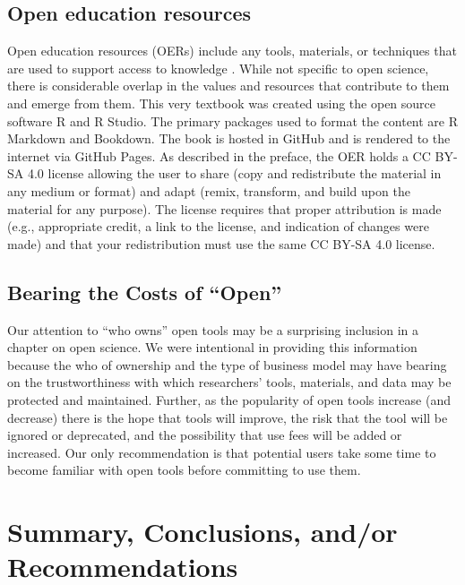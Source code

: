 \documentclass[
  11pt,
]{book}
\begin{document}
\hypertarget{open-education-resources}{%
\subsection{Open education resources}\label{open-education-resources}}

Open education resources (OERs) include any tools, materials, or techniques that are used to support access to knowledge \citep{bezjak_open_2018}. While not specific to open science, there is considerable overlap in the values and resources that contribute to them and emerge from them. This very textbook was created using the open source software R and R Studio. The primary packages used to format the content are R Markdown and Bookdown. The book is hosted in GitHub and is rendered to the internet via GitHub Pages. As described in the preface, the OER holds a CC BY-SA 4.0 license allowing the user to share (copy and redistribute the material in any medium or format) and adapt (remix, transform, and build upon the material for any purpose). The license requires that proper attribution is made (e.g., appropriate credit, a link to the license, and indication of changes were made) and that your redistribution must use the same CC BY-SA 4.0 license.

\hypertarget{bearing-the-costs-of-open}{%
\subsection{Bearing the Costs of ``Open''}\label{bearing-the-costs-of-open}}

Our attention to ``who owns'' open tools may be a surprising inclusion in a chapter on open science. We were intentional in providing this information because the who of ownership and the type of business model may have bearing on the trustworthiness with which researchers' tools, materials, and data may be protected and maintained. Further, as the popularity of open tools increase (and decrease) there is the hope that tools will improve, the risk that the tool will be ignored or deprecated, and the possibility that use fees will be added or increased. Our only recommendation is that potential users take some time to become familiar with open tools before committing to use them.

\hypertarget{summary-conclusions-andor-recommendations}{%
\section{Summary, Conclusions, and/or Recommendations}\label{summary-conclusions-andor-recommendations}}
\end{document}
